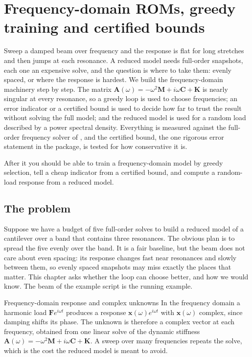\chapter{Frequency-domain ROMs, greedy training and certified bounds}\label{ch:freq}

\begin{tcolorbox}[colback=hpale,colframe=hnavy!60,coltitle=white,colbacktitle=hnavy!85,title={In this chapter}]
Sweep a damped beam over frequency and the response is flat for long stretches and then jumps at each resonance. A reduced model needs full-order snapshots, each one an expensive solve, and the question is where to take them: evenly spaced, or where the response is hardest. We build the frequency-domain machinery step by step. The matrix $\bm A(\omega)=-\omega^2\bm M+i\omega\bm C+\bm K$ is nearly singular at every resonance, so a greedy loop is used to choose frequencies; an error indicator or a certified bound is used to decide how far to trust the result without solving the full model; and the reduced model is used for a random load described by a power spectral density. Everything is measured against the full-order frequency solver of \fea{}, and the certified bound, the one rigorous error statement in the package, is tested for how conservative it is.\par\smallskip
After it you should be able to train a frequency-domain model by greedy selection, tell a cheap indicator from a certified bound, and compute a random-load response from a reduced model.
\end{tcolorbox}

\section{The problem}\label{sec:fr-problem}

Suppose we have a budget of five full-order solves to build a reduced model of a cantilever over a band that contains three resonances. The obvious plan is to spread the five evenly over the band. It is a fair baseline, but the beam does not care about even spacing: its response changes fast near resonances and slowly between them, so evenly spaced snapshots may miss exactly the places that matter. This chapter asks whether the loop can choose better, and how we would know. The beam of the example script is the running example.

\begin{sidenote}{Frequency-domain response and complex unknowns}
In the frequency domain a harmonic load $\bm F e^{i\omega t}$ produces a response $\bm x(\omega)e^{i\omega t}$ with $\bm x(\omega)$ complex, since damping shifts its phase. The unknown is therefore a complex vector at each frequency, obtained from one linear solve of the dynamic stiffness $\bm A(\omega)=-\omega^2\bm M+i\omega\bm C+\bm K$. A sweep over many frequencies repeats the solve, which is the cost the reduced model is meant to avoid.
\end{sidenote}

